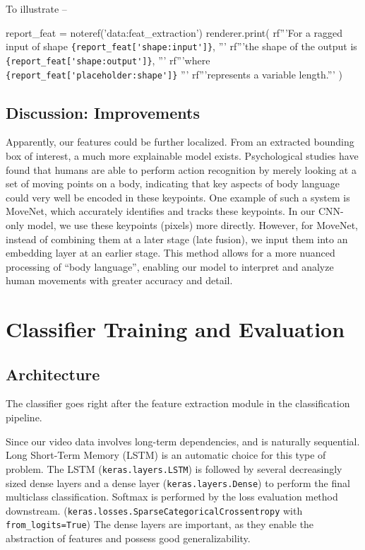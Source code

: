 \documentclass[letterpaper]{article} %
\begin{document}
To illustrate --
\begin{python}
  report_feat = noteref('data:feat_extraction')
  renderer.print(
    rf'''For a ragged input of shape \lstinline|{report_feat['shape:input']}|, '''
    rf'''the shape of the output is \lstinline|{report_feat['shape:output']}|, '''
    rf'''where \lstinline|{report_feat['placeholder:shape']}| '''
    rf'''represents a variable length.'''
  )
\end{python}

\subsection{Discussion: Improvements}
Apparently, our features could be further localized. 
From an extracted bounding box of interest, a much more explainable model exists. 
Psychological studies have found that humans are able to perform action recognition 
by merely looking at a set of moving points on a body, 
indicating that key aspects of body language could 
very well be encoded in these keypoints.
One example of such a system is MoveNet, 
which accurately identifies and tracks these keypoints. 
In our CNN-only model, we use these keypoints (pixels) more directly. 
However, for MoveNet, instead of combining them at a later stage (late fusion), 
we input them into an embedding layer at an earlier stage. 
This method allows for a more nuanced processing of ``body language'', 
enabling our model to interpret and analyze human movements 
with greater accuracy and detail.

\section{Classifier Training and Evaluation}

\subsection{Architecture}
The classifier goes right after the feature extraction
module in the classification pipeline.

Since our video data involves long-term dependencies,
and is naturally sequential.
Long Short-Term Memory (LSTM) is an automatic choice
for this type of problem.
The LSTM (\lstinline|keras.layers.LSTM|) is followed by 
several decreasingly sized dense layers
and a dense layer (\lstinline|keras.layers.Dense|)
to perform the final multiclass classification.
Softmax is performed by the loss evaluation method downstream.
(\lstinline|keras.losses.SparseCategoricalCrossentropy| 
with \lstinline|from_logits=True|)
The dense layers are important,
as they enable the abstraction of features
and possess good generalizability.
\end{document}
